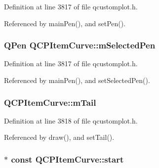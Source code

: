 Definition at line 3817 of file qcustomplot.\+h.



Referenced by main\+Pen(), and set\+Pen().

\hypertarget{class_q_c_p_item_curve_ab22cbab261b20be5aa8e4ca252149246}{}
\subsubsection[{m\+Selected\+Pen}]{\setlength{\rightskip}{0pt plus 5cm}Q\+Pen Q\+C\+P\+Item\+Curve\+::m\+Selected\+Pen\hspace{0.3cm}{\ttfamily [protected]}}\label{class_q_c_p_item_curve_ab22cbab261b20be5aa8e4ca252149246}


Definition at line 3817 of file qcustomplot.\+h.



Referenced by main\+Pen(), and set\+Selected\+Pen().

\hypertarget{class_q_c_p_item_curve_af1dca285b97e3f5b892dab827a79f327}{}
\subsubsection[{m\+Tail}]{ Q\+C\+P\+Item\+Curve\+::m\+Tail\hspace{0.3cm}{\ttfamily [protected]}}\label{class_q_c_p_item_curve_af1dca285b97e3f5b892dab827a79f327}


Definition at line 3818 of file qcustomplot.\+h.



Referenced by draw(), and set\+Tail().

\hypertarget{class_q_c_p_item_curve_a20c3b5ea31c33764f4f30c2ec7ae518b}{}
\subsubsection[{start}]{$\ast$ const Q\+C\+P\+Item\+Curve\+::start}\label{class_q_c_p_item_curve_a20c3b5ea31c33764f4f30c2ec7ae518b}


